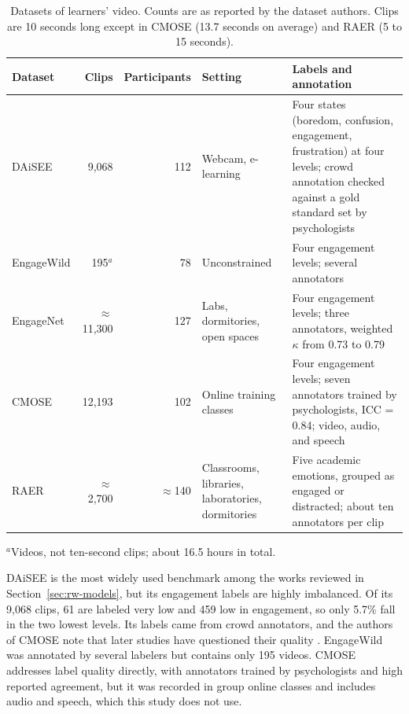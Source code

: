\begin{table}[t]
   \centering
   \caption[Datasets of learners' video]{Datasets of learners' video. Counts are as reported by the dataset authors. Clips are 10 seconds long except in CMOSE (13.7 seconds on average) and RAER (5 to 15 seconds).}
   \label{tab:rw-datasets}
   \small
   \begin{tabular}{L{2.1cm}rrL{2.5cm}L{4.2cm}}
      \toprule
      Dataset & Clips & Participants & Setting & Labels and annotation \\
      \midrule
      DAiSEE \cite{gupta2016} & 9,068 & 112 & Webcam, e-learning & Four states (boredom, confusion, engagement, frustration) at four levels; crowd annotation checked against a gold standard set by psychologists \\
      EngageWild \cite{kaur2018} & 195$^{a}$ & 78 & Unconstrained & Four engagement levels; several annotators \\
      EngageNet \cite{singh2023} & $\approx$11,300 & 127 & Labs, dormitories, open spaces & Four engagement levels; three annotators, weighted $\kappa$ from 0.73 to 0.79 \\
      CMOSE \cite{wu2024cmose} & 12,193 & 102 & Online training classes & Four engagement levels; seven annotators trained by psychologists, ICC = 0.84; video, audio, and speech \\
      RAER \cite{zhao2025} & $\approx$2,700 & $\approx$140 & Classrooms, libraries, laboratories, dormitories & Five academic emotions, grouped as engaged or distracted; about ten annotators per clip \\
      \bottomrule
   \end{tabular}

   \vspace{0.5ex}
   {\footnotesize $^{a}$Videos, not ten-second clips; about 16.5 hours in total.\par}
\end{table}

DAiSEE \cite{gupta2016} is the most widely used benchmark among the works reviewed in Section~\ref{sec:rw-models}, but its engagement labels are highly imbalanced. Of its 9,068 clips, 61 are labeled very low and 459 low in engagement, so only 5.7\% fall in the two lowest levels. Its labels came from crowd annotators, and the authors of CMOSE note that later studies have questioned their quality \cite{wu2024cmose}. EngageWild \cite{kaur2018} was annotated by several labelers but contains only 195 videos. CMOSE \cite{wu2024cmose} addresses label quality directly, with annotators trained by psychologists and high reported agreement, but it was recorded in group online classes and includes audio and speech, which this study does not use.

